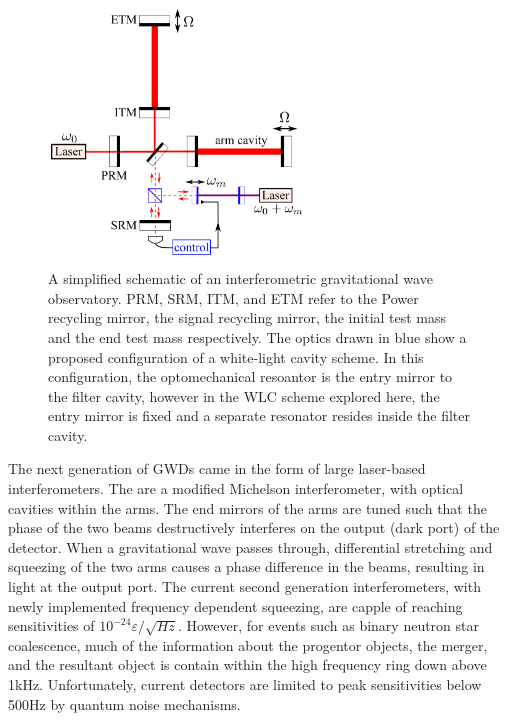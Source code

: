 \documentclass[aps,  
                a4paper, 
                amsmath, 
                amssymb, 
                preprint,
                tightenlines,  
                amsfonts,
                nofootinbib,
                onecolumn,
                titlepage,
                10pt
            ]{revtex4-2}
\begin{document}
    \begin{figure}[h]
        \centering
        \includegraphics[width=0.6\textwidth]{img/interferometer.png}
        \caption{A simplified schematic of an interferometric gravitational wave observatory. PRM, SRM, ITM, and ETM refer to the Power recycling mirror, the signal recycling mirror, the initial test mass and the end test mass respectively. The optics drawn in blue show a proposed configuration of a white-light cavity scheme. In this configuration, the optomechanical resoantor is the entry mirror to the filter cavity, however in the WLC scheme explored here, the entry mirror is fixed and a separate resonator resides inside the filter cavity\cite{miao2015}.}
        \label{fig:resonant_bar}
    \end{figure}
    \par
    The next generation of GWDs came in the form of large laser-based interferometers. The are a modified Michelson interferometer, with optical cavities within the arms. The end mirrors of the arms are tuned such that the phase of the two beams destructively interferes on the output (dark port) of the detector. When a gravitational wave passes through, differential stretching and squeezing of the two arms causes a phase difference in the beams, resulting in light at the output port. The current second generation interferometers, with newly implemented frequency dependent squeezing, are capple of reaching sensitivities of $10^{-24}\varepsilon/\sqrt{Hz}$. However, for events such as binary neutron star coalescence, much of the information about the progentor objects, the merger, and the resultant object is contain within the high frequency ring down above 1kHz\cite{page2021}. Unfortunately, current detectors are limited to peak sensitivities below 500Hz by quantum noise mechanisms.
\end{document}
